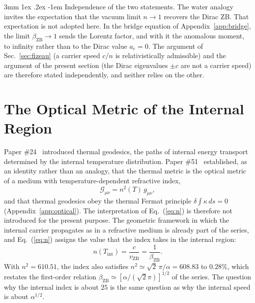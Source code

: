 \documentclass[%
 reprint, amsmath,amssymb, aps, prb, ]{revtex4-2}
\makeatletter
\numberwithin{equation}{section}
\renewcommand\paragraph{%
  \@startsection{paragraph}{4}{\z@}%
    {3mm \@plus 1ex \@minus .2ex}%
    {-1em}%
    {\normalfont\normalsize\itshape}}
\makeatother
\begin{document}
\paragraph{Independence of the two statements.} The water analogy invites the expectation that the vacuum limit $n \to 1$ recovers the Dirac ZB. That expectation is not adopted here. In the bridge equation of Appendix~\ref{app:bridge}, the limit $\beta_{\text{ZB}} \to 1$ sends the Lorentz factor, and with it the anomalous moment, to infinity rather than to the Dirac value $a_e = 0$. The argument of Sec.~\ref{sec:fizeau} (a carrier speed $c/n$ is relativistically admissible) and the argument of the present section (the Dirac eigenvalues $\pm c$ are not a carrier speed) are therefore stated independently, and neither relies on the other.

\section{The Optical Metric of the Internal Region}
\label{sec:optical}

Paper \#24~\cite{H24} introduced thermal geodesics, the paths of internal energy transport determined by the internal temperature distribution. Paper \#51~\cite{H51} established, as an identity rather than an analogy, that the thermal metric is the optical metric of a medium with temperature-dependent refractive index,
\begin{equation}
\mathcal{G}_{\mu\nu} = n^2(T)\,g_{\mu\nu},
\label{eq:optical}
\end{equation}
and that thermal geodesics obey the thermal Fermat principle $\delta\!\int\!\kappa\,ds = 0$ (Appendix~\ref{app:optical}). The interpretation of Eq.~(\ref{eq:n}) is therefore not introduced for the present purpose. The geometric framework in which the internal carrier propagates as in a refractive medium is already part of the series, and Eq.~(\ref{eq:n}) assigns the value that the index takes in the internal region:
\begin{equation}
n(T_{\text{int}}) = \frac{c}{v_{\text{ZB}}} = \frac{1}{\beta_{\text{ZB}}}.
\label{eq:nT}
\end{equation}
With $n^2 = 610.51$, the index also satisfies $n^2 \simeq \sqrt{2}\,\pi/\alpha = 608.83$ to $0.28\%$, which restates the first-order relation $\beta_{\text{ZB}} \simeq [\alpha/(\sqrt{2}\pi)]^{1/2}$ of the series. The question why the internal index is about $25$ is the same question as why the internal speed is about $\alpha^{1/2}$.
\end{document}
